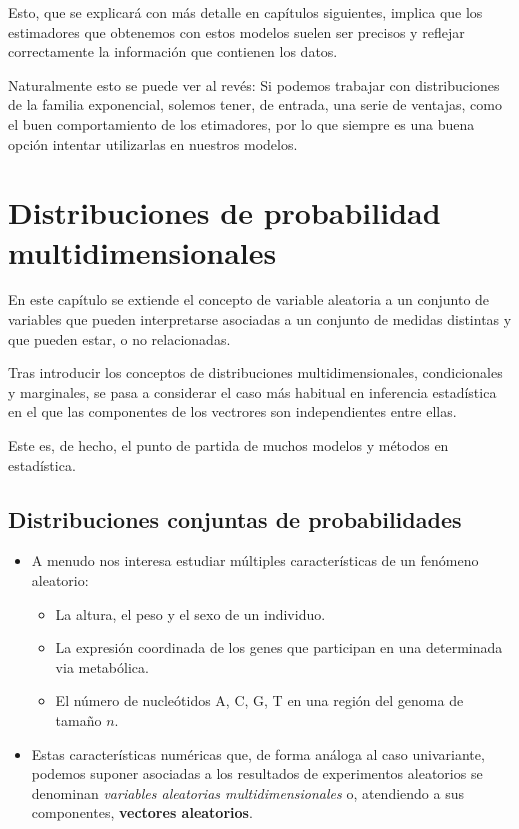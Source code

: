 \documentclass[
]{article}
\providecommand{\tightlist}{%
  \setlength{\itemsep}{0pt}\setlength{\parskip}{0pt}}
\begin{document}
Esto, que se explicará con más detalle en capítulos siguientes, implica que los estimadores que obtenemos con estos modelos suelen ser precisos y reflejar correctamente la información que contienen los datos.

Naturalmente esto se puede ver al revés: Si podemos trabajar con distribuciones de la familia exponencial, solemos tener, de entrada, una serie de ventajas, como el buen comportamiento de los etimadores, por lo que siempre es una buena opción intentar utilizarlas en nuestros modelos.

\newpage

\section{Distribuciones de probabilidad multidimensionales}\label{distribuciones-de-probabilidad-multidimensionales}

En este capítulo se extiende el concepto de variable aleatoria a un conjunto de variables que pueden interpretarse asociadas a un conjunto de medidas distintas y que pueden estar, o no relacionadas.

Tras introducir los conceptos de distribuciones multidimensionales, condicionales y marginales, se pasa a considerar el caso más habitual en inferencia estadística en el que las componentes de los vectrores son independientes entre ellas.

Este es, de hecho, el punto de partida de muchos modelos y métodos en estadística.

\subsection{Distribuciones conjuntas de probabilidades}\label{distribuciones-conjuntas-de-probabilidades}

\begin{itemize}
\item
  A menudo nos interesa estudiar múltiples características de un fenómeno aleatorio:

  \begin{itemize}
  \tightlist
  \item
    La altura, el peso y el sexo de un individuo.
  \item
    La expresión coordinada de los genes que participan en una determinada via metabólica.
  \item
    El número de nucleótidos A, C, G, T en una región del genoma de tamaño \(n\).
  \end{itemize}
\item
  Estas características numéricas que, de forma análoga al caso univariante, podemos suponer asociadas a los resultados de experimentos aleatorios se denominan \emph{variables aleatorias multidimensionales} o, atendiendo a sus componentes, \textbf{vectores aleatorios}.
\end{itemize}
\end{document}
